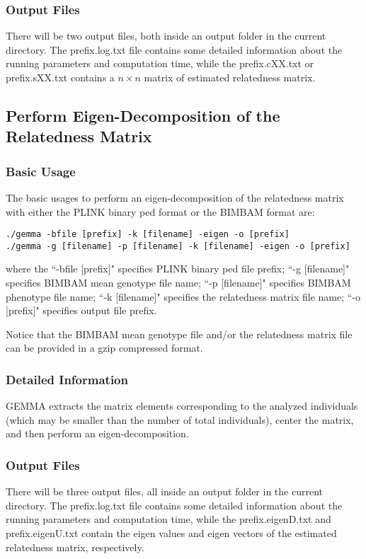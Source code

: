 \documentclass[11pt]{article}
\begin{document}
\subsubsection{Output Files}
There will be two output files, both inside an output folder in the current directory. The prefix.log.txt file contains some detailed information about the running parameters and computation time, while the prefix.cXX.txt or prefix.sXX.txt contains a $n\times n$ matrix of estimated relatedness matrix.



\subsection{Perform Eigen-Decomposition of the Relatedness Matrix}
\subsubsection{Basic Usage}
The basic usages to perform an eigen-decomposition of the relatedness matrix with either the PLINK binary ped format or the BIMBAM format are:
%
\begin{verbatim}
./gemma -bfile [prefix] -k [filename] -eigen -o [prefix]
./gemma -g [filename] -p [filename] -k [filename] -eigen -o [prefix]
\end{verbatim}
%
where the ``-bfile [prefix]" specifies PLINK binary ped file prefix; ``-g [filename]" specifies BIMBAM mean genotype file name; ``-p [filename]" specifies BIMBAM phenotype file name; ``-k [filename]" specifies the relatedness matrix file name; ``-o [prefix]" specifies output file prefix. 

Notice that the BIMBAM mean genotype file and/or the relatedness matrix file can be provided in a gzip compressed format.

\subsubsection{Detailed Information}
GEMMA extracts the matrix elements corresponding to the analyzed individuals (which may be smaller than the number of total individuals), center the matrix, and then perform an eigen-decomposition. 



\subsubsection{Output Files}
There will be three output files, all inside an output folder in the current directory. The prefix.log.txt file contains some detailed information about the running parameters and computation time, while the prefix.eigenD.txt and prefix.eigenU.txt contain the eigen values and eigen vectors of the estimated relatedness matrix, respectively.
\end{document}
